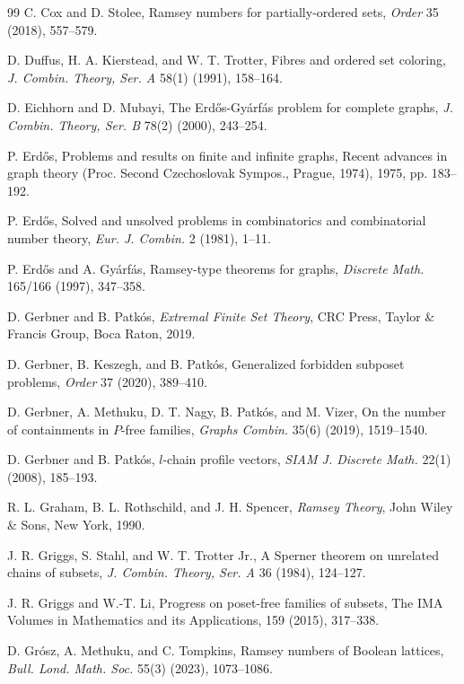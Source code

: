 \documentclass[twoside,12pt]{article}
\begin{document}
\begin{thebibliography}{99}
C. Cox and D. Stolee, Ramsey numbers for partially-ordered sets, \emph{Order} 35 (2018), 557--579.

D. Duffus, H. A. Kierstead, and W. T. Trotter, Fibres and ordered set coloring, \emph{J. Combin. Theory, Ser. A} 58(1) (1991), 158--164.

D. Eichhorn and D. Mubayi, The Erd\H{o}s-Gy\'{a}rf\'{a}s problem for complete graphs, \emph{J. Combin. Theory, Ser. B} 78(2) (2000), 243--254.

P. Erd\H{o}s, Problems and results on finite and infinite graphs, Recent advances in graph theory (Proc. Second Czechoslovak Sympos., Prague, 1974), 1975, pp. 183--192.

P. Erd\H{o}s, Solved and unsolved problems in combinatorics and combinatorial number theory, \emph{Eur. J. Combin.} 2 (1981), 1--11.

P. Erd\H{o}s and A. Gy\'{a}rf\'{a}s, Ramsey-type theorems for graphs, \emph{Discrete Math.} 165/166 (1997), 347--358.

D. Gerbner and B. Patk\'{o}s, \emph{Extremal Finite Set Theory}, CRC Press, Taylor \& Francis Group, Boca Raton, 2019.

D. Gerbner, B. Keszegh, and B. Patk\'{o}s, Generalized forbidden subposet problems, \emph{Order} 37 (2020), 389--410.

D. Gerbner, A. Methuku, D. T. Nagy, B. Patk\'{o}s, and M. Vizer, On the number of containments in $P$-free families, \emph{Graphs Combin.} 35(6) (2019), 1519--1540.

D. Gerbner and B. Patk\'{o}s, $l$-chain profile vectors, \emph{SIAM J. Discrete Math.} 22(1) (2008), 185--193.

R. L. Graham, B. L. Rothschild, and J. H. Spencer, \emph{Ramsey Theory}, John Wiley \& Sons, New York, 1990.

J. R. Griggs, S. Stahl, and W. T. Trotter Jr., A Sperner theorem on unrelated chains of subsets, \emph{J. Combin. Theory, Ser. A} 36 (1984), 124--127.

J. R. Griggs and W.-T. Li, Progress on poset-free families of subsets, The IMA Volumes in Mathematics and its Applications, 159 (2015), 317--338.

D. Gr\'{o}sz, A. Methuku, and C. Tompkins, Ramsey numbers of Boolean lattices, \emph{Bull. Lond. Math. Soc.} 55(3) (2023), 1073--1086.


\end{thebibliography}
\end{document}
